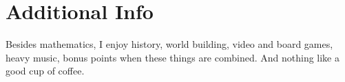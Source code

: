 \documentclass[a4paper,11pt]{twentysecondcv} %
\begin{document}

\section{Additional Info}
Besides mathematics, I enjoy history, world building, video and board games, heavy music, bonus points when these things are combined. And nothing like a good cup  of coffee.
\end{document}
